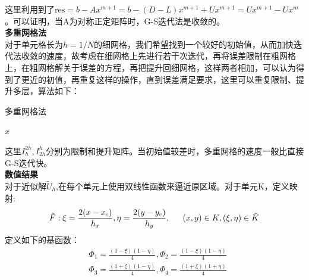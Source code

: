 \documentclass[12pt]{ctexart}
\begin{document}
\noindent 这里利用到了$\text{res} = b - Ax^{m+1} = b - (D-L)x^{m+1} + Ux^{m+1} = Ux^{m+1} - Ux^m$。可以证明，当A为对称正定矩阵时，G-S迭代法是收敛的。\\
\noindent \textbf{多重网格法}\\
对于单元格长为$h=1/N$的细网格，我们希望找到一个较好的初始值，从而加快迭代法收敛的速度，故考虑在细网格上先进行若干次迭代，再将误差限制在粗网格上，在粗网格解关于误差的方程，再把提升回细网格，这样两者相加，可以认为得到了更近的初值，再重复这样的操作，直到误差满足要求，这里可以重复限制、提升多层，算法如下：\\
\begin{algorithm}[H]
	\caption{多重网格法}
	\label{alg:MG}  
	\Return $x$\;
\end{algorithm}
\noindent 这里$I_{h}^{2h},I_{2h}^{h}$分别为限制和提升矩阵。当初始值较差时，多重网格的速度一般比直接G-S迭代快。\\
\noindent \textbf{数值结果}\\
对于近似解$\tilde{U}_{h}$,在每个单元上使用双线性函数来逼近原区域。对于单元K，定义映射:
$$\tilde{F}:\xi=\frac{2(x-x_c)}{h_x},\eta=\frac{2(y-y_c)}{h_y},\indent (x,y)\in K,(\xi,\eta)\in \tilde{K}$$
定义如下的基函数：
$$
	\begin{aligned}
& \Phi_1 = \frac{(1-\xi)(1-\eta)}{4},\Phi_2=\frac{(1-\xi)(1-\eta)}{4}\\
& \Phi_3 = \frac{(1+\xi)(1-\eta)}{4},\Phi_4=\frac{(1+\xi)(1+\eta)}{4}\\
\end{aligned} 
$$
\end{document}
